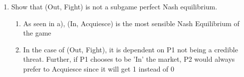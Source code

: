 \documentclass[11pt]{article}
\begin{document}
\begin{enumerate}
\begin{enumerate}
	\item Show that (Out, Fight) is not a subgame perfect Nash equilibrium.
	\begin{enumerate}
        \item As seen in a), (In, Acquiesce) is the most sensible Nash Equilibrium of the game
        \item In the case of (Out, Fight), it is dependent on P1 not being a credible threat. Further, if P1 chooses to be 'In' the market, P2 would always prefer to Acquiesce since it will get 1 instead of 0
    \end{enumerate}
	\end{enumerate}

\end{enumerate}
\end{document}
